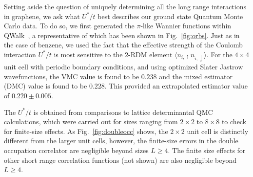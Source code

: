 \documentclass[aip,jcp,twocolumn,10pt]{revtex4-1}
\begin{document}
Setting aside the question of uniquely determining all the long range interactions
in graphene, we ask what $U^{*}/t$ best describes our ground state Quantum Monte Carlo data. 
To do so, we first generated the $\pi$-like Wannier functions 
within QWalk~\cite{QWALK}, a representative of which has been shown in Fig.~\ref{fig:orbs}. 
Just as in the case of benzene, we used the fact 
that the effective strength of the Coulomb interaction 
$U^{*}/t$ is most sensitive to the 2-RDM element 
$\langle n_{i,\uparrow} n_{i,\downarrow}\rangle$. For the $4\times4$ 
unit cell with periodic boundary conditions, and using optimized Slater Jastrow wavefunctions, 
the VMC value is found to be $0.238$ and the mixed estimator (DMC) value is found to be 
$0.228$. This provided an extrapolated estimator value of $0.220 \pm 0.005$.

The $U^{*}/t$ is obtained from comparisons to 
lattice determinantal QMC calculations, which were carried out for 
sizes ranging from $2 \times 2$ to $8 \times 8$ to check for finite-size effects. 
As Fig.~\ref{fig:doubleocc} shows, the $2 \times 2$ unit cell is distinctly different from 
the larger unit cells, however, the finite-size errors in the 
double occupation correlator are negligible beyond sizes $L\geq 4$. 
The finite size effects for other short range correlation functions (not shown) are also negligible beyond 
$L \geq 4$.
\end{document}
